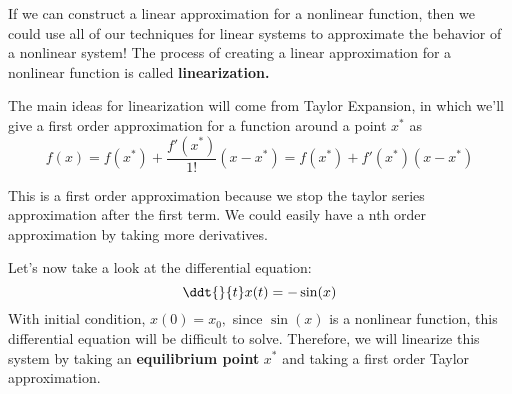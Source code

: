 If we can construct a linear approximation for a nonlinear function, then we could use all of our techniques for linear systems to approximate the behavior of a nonlinear system!
The process of creating a linear approximation for a nonlinear function is called \textbf{linearization.}

The main ideas for linearization will come from Taylor Expansion, in which we'll give a first order approximation for a function around a point $x^{*}$ as
\begin{equation} \label{eqn:ta}
  f(x) = f(x^{*}) + \frac{f'(x^{*})}{1!} (x - x^{*}) = f(x^{*}) + f'(x^{*}) (x - x^{*})
\end{equation}

This is a first order approximation because we stop the taylor series approximation after the first term.
We could easily have a nth order approximation by taking more derivatives.


Let's now take a look at the differential equation:
\begin{equation} \label{eqn:nl}
  \ddt{}{t} x(t) = - \sin(x)
\end{equation}
With initial condition, $x(0) = x_{0},$ since $\sin(x)$ is a nonlinear function, this differential equation will be difficult to solve.
Therefore, we will linearize this system by taking an \textbf{equilibrium point} $x^{*}$ and taking a first order Taylor approximation.

